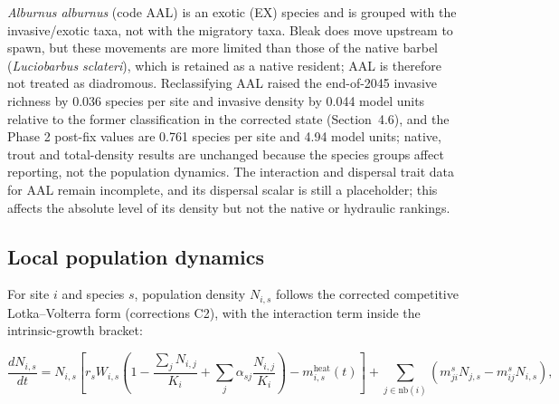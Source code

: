 \documentclass[11pt,a4paper]{article}
\begin{document}
\textit{Alburnus alburnus} (code AAL) is an exotic (EX) species and is grouped with the invasive/exotic taxa, not with the migratory taxa. Bleak does move upstream to spawn, but these movements are more limited than those of the native barbel (\textit{Luciobarbus sclateri}), which is retained as a native resident; AAL is therefore not treated as diadromous. Reclassifying AAL raised the end-of-2045 invasive richness by 0.036 species per site and invasive density by 0.044 model units relative to the former classification in the corrected state (Section~4.6), and the Phase 2 post-fix values are 0.761 species per site and 4.94 model units; native, trout and total-density results are unchanged because the species groups affect reporting, not the population dynamics. The interaction and dispersal trait data for AAL remain incomplete, and its dispersal scalar is still a placeholder; this affects the absolute level of its density but not the native or hydraulic rankings.

\subsection{Local population dynamics}

For site $i$ and species $s$, population density $N_{i,s}$ follows the corrected competitive Lotka--Volterra form (corrections C2), with the interaction term inside the intrinsic-growth bracket:

\begin{equation}
\frac{dN_{i,s}}{dt} = N_{i,s}\left[r_s W_{i,s}\left(1-\frac{\sum_j N_{i,j}}{K_i} + \sum_j \alpha_{sj}\frac{N_{i,j}}{K_i}\right) - m^{\mathrm{heat}}_{i,s}(t)\right]
  + \sum_{j\in\mathrm{nb}(i)}\left(m^s_{ji}N_{j,s}-m^s_{ij}N_{i,s}\right),
\end{equation}
\end{document}
